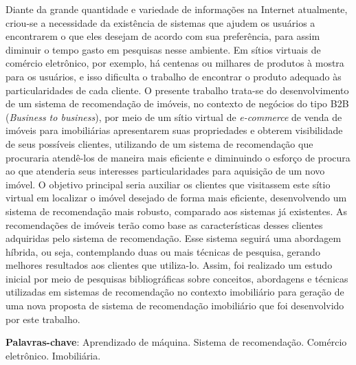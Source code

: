 \begin{resumo}

Diante da grande quantidade e variedade de informações na Internet atualmente, criou-se a necessidade da existência de sistemas que ajudem os usuários a encontrarem o que eles desejam de acordo com sua preferência, para assim diminuir o tempo gasto em pesquisas nesse ambiente. Em sítios virtuais de comércio eletrônico, por exemplo, há centenas ou milhares de produtos à mostra para os usuários, e isso dificulta o trabalho de encontrar o produto adequado às particularidades de cada cliente. O presente trabalho trata-se do desenvolvimento de um sistema de recomendação de imóveis, no contexto de negócios do tipo B2B (\textit{Business to business}), por meio de um sítio virtual de \textit{e-commerce} de venda de imóveis para imobiliárias apresentarem suas propriedades e obterem visibilidade de seus possíveis clientes, utilizando de um sistema de recomendação que procuraria atendê-los de maneira mais eficiente e diminuindo o esforço de procura ao que atenderia seus interesses particularidades para aquisição de um novo imóvel. O objetivo principal seria auxiliar os clientes que visitassem este sítio virtual em localizar o imóvel desejado de forma mais eficiente, desenvolvendo um sistema de recomendação mais robusto, comparado aos sistemas já existentes. As recomendações de imóveis terão como base as características desses clientes adquiridas pelo sistema de recomendação. Esse sistema seguirá uma abordagem híbrida, ou seja, contemplando duas ou mais técnicas de pesquisa, gerando melhores resultados aos clientes que utiliza-lo. Assim, foi realizado um estudo inicial por meio de pesquisas bibliográficas sobre conceitos, abordagens e técnicas utilizadas em sistemas de recomendação no contexto imobiliário para geração de uma nova proposta de sistema de recomendação imobiliário que foi desenvolvido por este trabalho.

 \vspace{\onelineskip}
    
 \noindent
 \textbf{Palavras-chave}: Aprendizado de máquina. Sistema de recomendação. Comércio eletrônico. Imobiliária.
\end{resumo}
